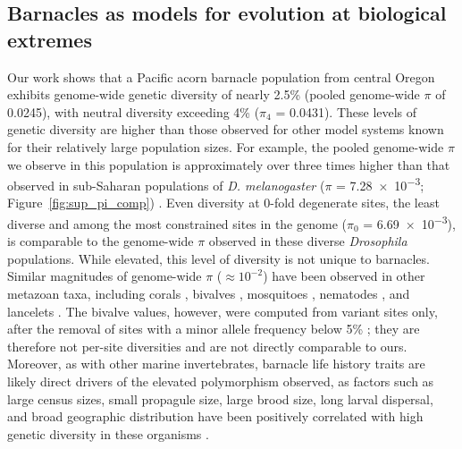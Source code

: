 \subsection*{Barnacles as models for evolution at biological extremes}

Our work shows that a Pacific acorn barnacle population from central Oregon exhibits
genome-wide genetic diversity of nearly 2.5\% (pooled genome-wide $\pi$ of 0.0245),
with neutral diversity exceeding 4\% ($\pi_4$ = 0.0431).
These levels of genetic diversity are higher than those observed for other model
systems known for their relatively large population sizes.
For example, the pooled genome-wide $\pi$ we observe in this population is approximately
over three times higher than that observed in sub-Saharan populations of 
\textit{D. melanogaster} ($\pi$ = \num{7.28e-3}; Figure~\ref{fig:sup_pi_comp})
\citep{nunez_footprints_2025,li_comparative_2025,pool_population_2012,
langley_genomic_2012}.
Even diversity at 0-fold degenerate sites, the least diverse and among the most
constrained sites in the \bgla{} genome ($\pi_0$ = \num{6.69e-3}), is
comparable to the genome-wide $\pi$ observed in these diverse \textit{Drosophila}
populations.
While elevated, this level of diversity is not unique to barnacles.
Similar magnitudes of genome-wide $\pi$ ($\approx10^{-2}$) have been observed
in other metazoan taxa, including corals \citep{meziere_corals_2025}, bivalves
\citep{liu_bivalves_2025}, mosquitoes \citep{kent_aedes_2025,ag1000g}, nematodes
\citep{teterina_nematodes_2023}, and lancelets \citep{braso-vives_highly_2026}.
The bivalve values, however, were computed from variant sites only, after the removal
of sites with a minor allele frequency below 5\% \citep{liu_bivalves_2025}; they are
therefore not per-site diversities and are not directly comparable to ours.
Moreover, as with other marine invertebrates, barnacle life history traits are likely
direct drivers of the elevated polymorphism observed, as factors such as large census
sizes, small propagule size, large brood size, long larval dispersal, and broad geographic
distribution have been positively correlated with high genetic diversity in these
organisms \citep{leffler_revisiting_2012,romiguier_comparative_2014,toczydlowski_2025_diversity}.
\vspace{0.1cm}

